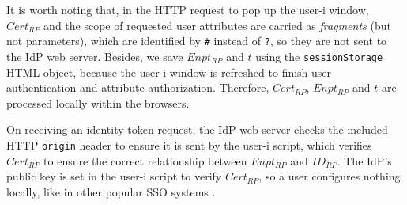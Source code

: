 It is worth noting that,
in the HTTP request to pop up the user-i window, $Cert_{RP}$ and the scope of requested user attributes are carried as \emph{fragments} (but not parameters), which are identified by \texttt{\#} instead of \texttt{?},
    so they are not sent to the IdP web server.
Besides, we save $Enpt_{RP}$ and $t$ using the \verb+sessionStorage+ HTML object,
    because the user-i window is refreshed to finish user authentication and attribute authorization.
Therefore, $Cert_{RP}$, $Enpt_{RP}$ and $t$ are processed locally within the browsers.

On receiving an identity-token request, the IdP web server checks the included HTTP \texttt{origin} header to ensure it is sent by the user-i script,
which verifies $Cert_{RP}$ to ensure the correct relationship between $Enpt_{RP}$ and $ID_{RP}$.
The IdP's public key is set in the user-i script to verify $Cert_{RP}$,
so a user configures nothing locally,
 like in other popular SSO systems \cite{OpenIDConnect, rfc6749, SAML, SAMLIdentifier}.


%

